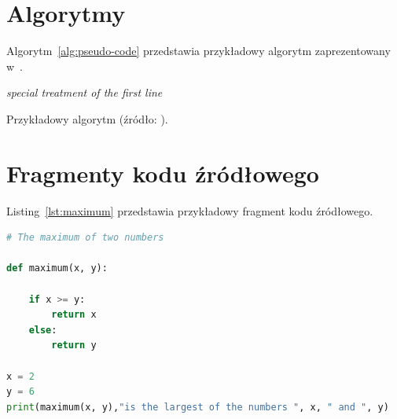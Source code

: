 \documentclass[polish]{aghengthesis}
\newcommand{\listofalgorithmes}{\tocfile{\listalgorithmcfname}{loa}}
\renewcommand\lstlistlistingname{\LangListOfListings}
\renewcommand{\lstlistoflistings}{\begingroup
\tocfile{\lstlistlistingname}{lol}
\endgroup}
\begin{document}
\section{Algorytmy}
\label{sec:algorytmy}

Algorytm~\ref{alg:pseudo-code} przedstawia przykładowy algorytm zaprezentowany w~\cite{fiorio2017algorithm2e}. 

\begin{algorithm}[!htbp]
\BlankLine
\emph{special treatment of the first line}\;
  \caption[Przykładowy algorytm]{Przykładowy algorytm (źródło: \cite{fiorio2017algorithm2e}).}
  \label{alg:pseudo-code}
\end{algorithm}

\section{Fragmenty kodu źródłowego}
\label{sec:listingi}
Listing~\ref{lst:maximum} przedstawia przykładowy fragment kodu źródłowego.

\begin{lstlisting}[language=Python,float=!htbp,caption={[Przykładowy fragment kodu]Przykładowy fragment kodu (źródło:
  \cite{author2021title})},label=lst:maximum]
# The maximum of two numbers

def maximum(x, y):

    if x >= y:
        return x
    else:
        return y

x = 2
y = 6
print(maximum(x, y),"is the largest of the numbers ", x, " and ", y)

\end{lstlisting}

\printbibliography

\listoffigures
\listoftables
\listofalgorithmes
\lstlistoflistings
\end{document}
